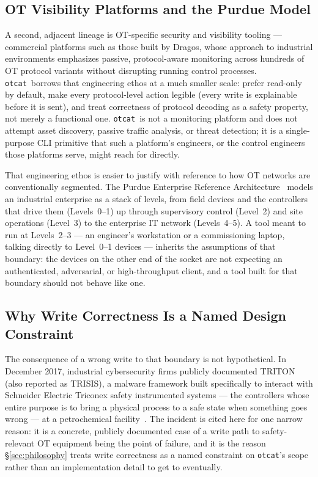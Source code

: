 \documentclass[10pt,conference]{IEEEtran}
\newcommand{\otcat}{\texttt{otcat}}
\begin{document}
\subsection{OT Visibility Platforms and the Purdue Model}

A second, adjacent lineage is OT-specific security and visibility
tooling --- commercial platforms such as those built by Dragos, whose
approach to industrial environments emphasizes passive, protocol-aware
monitoring across hundreds of OT protocol variants without disrupting
running control processes. \otcat\ borrows that engineering ethos at a
much smaller scale: prefer read-only by default, make every
protocol-level action legible (every write is explainable before it is
sent), and treat correctness of protocol decoding as a safety property,
not merely a functional one. \otcat\ is not a monitoring platform and
does not attempt asset discovery, passive traffic analysis, or
threat detection; it is a single-purpose CLI primitive that such a
platform's engineers, or the control engineers those platforms serve,
might reach for directly.

That engineering ethos is easier to justify with reference to how OT
networks are conventionally segmented. The Purdue Enterprise Reference
Architecture~\cite{williams1994} models an industrial enterprise as a
stack of levels, from field devices and the controllers that drive
them (Levels~0--1) up through supervisory control (Level~2) and site
operations (Level~3) to the enterprise IT network (Levels~4--5). A tool
meant to run at Levels~2--3 --- an engineer's workstation or a
commissioning laptop, talking directly to Level~0--1 devices --- inherits
the assumptions of that boundary: the devices on the other end of the
socket are not expecting an authenticated, adversarial, or
high-throughput client, and a tool built for that boundary should not
behave like one.

\subsection{Why Write Correctness Is a Named Design Constraint}

The consequence of a wrong write to that boundary is not hypothetical.
In December 2017, industrial cybersecurity firms publicly documented
TRITON (also reported as TRISIS), a malware framework built
specifically to interact with Schneider Electric Triconex safety
instrumented systems --- the controllers whose entire purpose is to bring
a physical process to a safe state when something goes wrong --- at a
petrochemical facility~\cite{fireeye_triton2017}. The incident is cited
here for one narrow reason: it is a concrete, publicly documented case
of a write path to safety-relevant OT equipment being the point of
failure, and it is the reason \S\ref{sec:philosophy} treats write
correctness as a named constraint on \otcat's scope rather than an
implementation detail to get to eventually.
\end{document}
